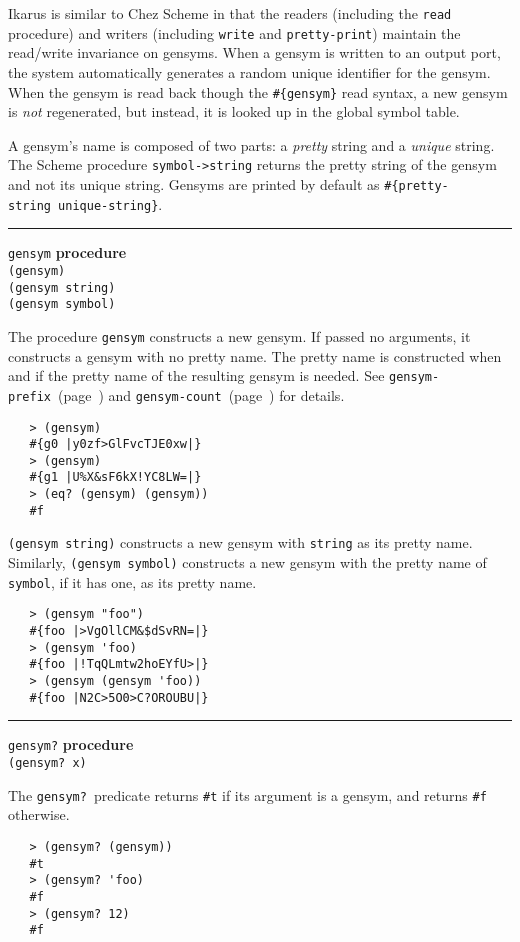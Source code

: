 \documentclass[onecolumn, 12pt, twoside, openright, dvipdfm]{book}
\makeatletter
\newcommand{\defref}[1]{\texttt{#1}~(page~\pageref{#1})}
\newcommand{\idxdefun}[3]{
\vspace{1ex}
\rule{\textwidth}{2pt}
{\index{#1@\texttt{#2}}\label{#1}{\Large\texttt{#2}} \hfill \textbf{#3}}\\
}
\newcommand{\defun}[2]{\idxdefun{#1}{#1}{#2}}
\makeatother
\begin{document}
Ikarus is similar to Chez Scheme in that the readers (including the
\texttt{read} procedure) and writers (including \texttt{write} and
\texttt{pretty-print}) maintain the read/write invariance on
gensyms.  When a gensym is written to an output port, the system
automatically generates a random unique identifier for the gensym.
When the gensym is read back though the \texttt{\#\{gensym\}} read
syntax, a new gensym is \emph{not} regenerated, but instead, it is
looked up in the global symbol table. 

A gensym's name is composed of two parts: a \emph{pretty} string and
a \emph{unique} string.  The Scheme procedure
\texttt{symbol->string} returns the pretty string of the gensym and
not its unique string.  Gensyms are printed by default as 
\texttt{\#\{pretty-string~unique-string\}}.

\defun{gensym}{procedure}
\texttt{(gensym)}\\
\texttt{(gensym string)}\\
\texttt{(gensym symbol)}

The procedure \texttt{gensym} constructs a new gensym.  If passed no
arguments, it constructs a gensym with no pretty name.  The pretty
name is constructed when and if the pretty name of the resulting
gensym is needed.
See \defref{gensym-prefix} and \defref{gensym-count} for details. 

\begin{verbatim}
   > (gensym)
   #{g0 |y0zf>GlFvcTJE0xw|}
   > (gensym)
   #{g1 |U%X&sF6kX!YC8LW=|}
   > (eq? (gensym) (gensym))
   #f
\end{verbatim}

\texttt{(gensym string)} constructs a new gensym with
\texttt{string} as its pretty name.   Similarly,
\texttt{(gensym~symbol)} constructs a new gensym with the pretty
name of \texttt{symbol}, if it has one, as its pretty name.

\begin{verbatim}
   > (gensym "foo")
   #{foo |>VgOllCM&$dSvRN=|}
   > (gensym 'foo)
   #{foo |!TqQLmtw2hoEYfU>|}
   > (gensym (gensym 'foo))
   #{foo |N2C>5O0>C?OROUBU|}
\end{verbatim}



\defun{gensym?}{procedure}
\texttt{(gensym? x)}

The \texttt{gensym?}\ predicate returns \texttt{\#t} if its argument
is a gensym, and returns \texttt{\#f} otherwise.

\begin{verbatim}
   > (gensym? (gensym))
   #t
   > (gensym? 'foo)
   #f
   > (gensym? 12)
   #f
\end{verbatim}
\end{document}
